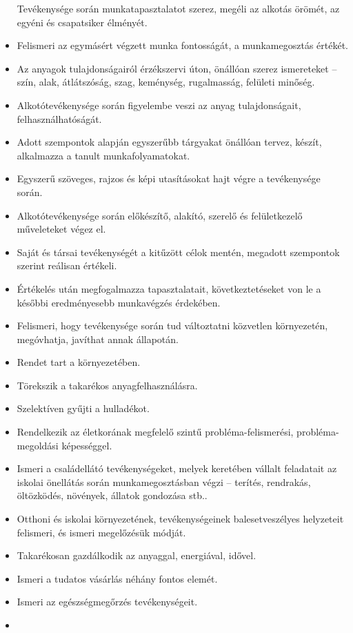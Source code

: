 \begin{itemize}
  Tevékenysége során munkatapasztalatot szerez, megéli az alkotás
  örömét, az egyéni és csapatsiker élményét.
\item
  Felismeri az egymásért végzett munka fontosságát, a munkamegosztás
  értékét.
\item
  Az anyagok tulajdonságairól érzékszervi úton, önállóan szerez
  ismereteket -- szín, alak, átlátszóság, szag, keménység, rugalmasság,
  felületi minőség.
\item
  Alkotótevékenysége során figyelembe veszi az anyag tulajdonságait,
  felhasználhatóságát.
\item
  Adott szempontok alapján egyszerűbb tárgyakat önállóan tervez, készít,
  alkalmazza a tanult munkafolyamatokat.
\item
  Egyszerű szöveges, rajzos és képi utasításokat hajt végre a
  tevékenysége során.
\item
  Alkotótevékenysége során előkészítő, alakító, szerelő és felületkezelő
  műveleteket végez el.
\item
  Saját és társai tevékenységét a kitűzött célok mentén, megadott
  szempontok szerint reálisan értékeli.
\item
  Értékelés után megfogalmazza tapasztalatait, következtetéseket von le
  a későbbi eredményesebb munkavégzés érdekében.
\item
  Felismeri, hogy tevékenysége során tud változtatni közvetlen
  környezetén, megóvhatja, javíthat annak állapotán.
\item
  Rendet tart a környezetében.
\item
  Törekszik a takarékos anyagfelhasználásra.
\item
  Szelektíven gyűjti a hulladékot.
\item
  Rendelkezik az életkorának megfelelő szintű probléma-felismerési,
  probléma-megoldási képességgel.
\item
  Ismeri a családellátó tevékenységeket, melyek keretében vállalt
  feladatait az iskolai önellátás során munkamegosztásban végzi --
  terítés, rendrakás, öltözködés, növények, állatok gondozása stb..
\item
  Otthoni és iskolai környezetének, tevékenységeinek balesetveszélyes
  helyzeteit felismeri, és ismeri megelőzésük módját.
\item
  Takarékosan gazdálkodik az anyaggal, energiával, idővel.
\item
  Ismeri a tudatos vásárlás néhány fontos elemét.
\item
  Ismeri az egészségmegőrzés tevékenységeit.
\item

\end{itemize}
